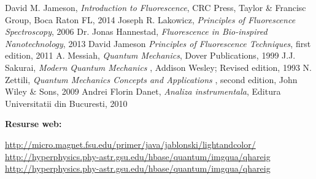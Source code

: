 \begin{thebibliography}{99}

 David M. Jameson, {\it Introduction to Fluorescence}, CRC Press, Taylor \& Francisc Group, Boca Raton FL, 2014
 Joseph R. Lakowicz, {\it Principles of Fluorescence Spectroscopy}, 2006
 Dr. Jonas Hannestad, {\it Fluorescence in Bio-inspired Nanotechnology}, 2013
 David Jameson {\it Principles of Fluorescence Techniques}, first edition, 2011
 A. Messiah, {\it Quantum Mechanics},  Dover Publications, 1999
 J.J. Sakurai, {\it Modern Quantum Mechanics }, Addison Wesley; Revised edition, 1993
 N. Zettili, {\it Quantum Mechanics Concepts and Applications }, second edition, John Wiley \& Sons, 2009
 Andrei Florin Danet, {\it Analiza instrumentala}, Editura Universitatii din Bucuresti, 2010

{\bf Resurse web:}

 \url{ http://micro.magnet.fsu.edu/primer/java/jablonski/lightandcolor/ }
  \url{ http://hyperphysics.phy-astr.gsu.edu/hbase/quantum/imgqua/qhareig }
  \url{ http://hyperphysics.phy-astr.gsu.edu/hbase/quantum/imgqua/qhareig }
\end{thebibliography}





